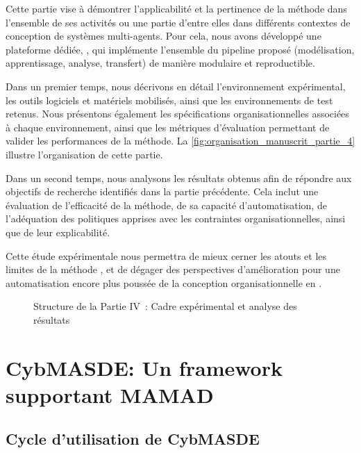 \noindent
Cette partie vise à démontrer l'applicabilité et la pertinence de la méthode  dans l'ensemble de ses activités ou une partie d'entre elles dans différents contextes de conception de systèmes multi-agents. Pour cela, nous avons développé une plateforme dédiée, , qui implémente l'ensemble du pipeline proposé (modélisation, apprentissage, analyse, transfert) de manière modulaire et reproductible.

\medskip

\noindent
Dans un premier temps, nous décrivons en détail l'environnement expérimental, les outils logiciels et matériels mobilisés, ainsi que les environnements de test retenus. Nous présentons également les spécifications organisationnelles associées à chaque environnement, ainsi que les métriques d'évaluation permettant de valider les performances de la méthode. La \autoref{fig:organisation_manuscrit_partie_4} illustre l'organisation de cette partie.

\medskip

\noindent
Dans un second temps, nous analysons les résultats obtenus afin de répondre aux objectifs de recherche identifiés dans la partie précédente. Cela inclut une évaluation de l'efficacité de la méthode, de sa capacité d'automatisation, de l'adéquation des politiques apprises avec les contraintes organisationnelles, ainsi que de leur explicabilité.

\medskip

\noindent
Cette étude expérimentale nous permettra de mieux cerner les atouts et les limites de la méthode , et de dégager des perspectives d'amélioration pour une automatisation encore plus poussée de la conception organisationnelle en .

\begin{figure}[h!]
    \centering
    \resizebox{0.7\linewidth}{!}{%
        
    }
    \caption{Structure de la Partie IV~: Cadre expérimental et analyse des résultats}
    \label{fig:organisation_manuscrit_partie_4}
\end{figure}

\clearpage
\thispagestyle{empty}
\null
\newpage

\chapter{CybMASDE: Un framework supportant MAMAD}
\label{sec:cybmasde}

\section*{Cycle d’utilisation de CybMASDE}\label{sec:cybmasde_cycle}

